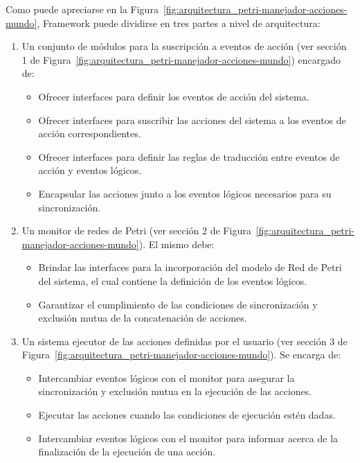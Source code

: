 Como puede apreciarse en la
Figura~\ref{fig:arquitectura_petri-manejador-acciones-mundo}, \nombreFramework
Framework puede dividirse en tres partes a nivel de arquitectura:
\begin{enumerate}
  \item Un conjunto de módulos para la suscripción a eventos de acción (ver
  sección 1 de Figura~\ref{fig:arquitectura_petri-manejador-acciones-mundo}) encargado de:
  \begin{itemize}
    \item Ofrecer interfaces para definir los eventos de acción del sistema.
    \item Ofrecer interfaces para suscribir las acciones del sistema a los
    eventos de acción correspondientes.
    \item Ofrecer interfaces para definir las reglas de traducción entre eventos
    de acción y eventos lógicos.
    \item Encapsular las acciones junto a los eventos lógicos necesarios para su
    sincronización.
  \end{itemize}
\item Un monitor de redes de Petri (ver sección 2 de
Figura~\ref{fig:arquitectura_petri-manejador-acciones-mundo}). El mismo debe:
	\begin{itemize}
	  \item Brindar las interfaces para la incorporación del modelo de Red de Petri
	  del sistema, el cual contiene la definición de los eventos
	  lógicos.
	  \item Garantizar el cumplimiento de las condiciones de sincronización y
	  exclusión mutua de la concatenación de acciones.
	\end{itemize}
\item Un sistema ejecutor de las acciones definidas por el usuario (ver sección 3 de
  Figura~\ref{fig:arquitectura_petri-manejador-acciones-mundo}). Se encarga de:
  \begin{itemize}
	  \item Intercambiar eventos lógicos con el monitor para asegurar la
	  sincronización y exclusión mutua en la ejecución de las acciones.
	  \item Ejecutar las acciones cuando las condiciones de ejecución
	  estén dadas.
	  \item Intercambiar eventos lógicos con el monitor para informar acerca de la
	  finalización de la ejecución de una acción.
	\end{itemize}
\end{enumerate}

